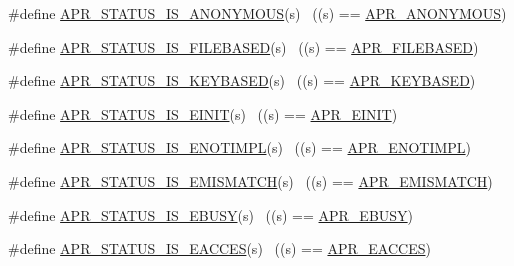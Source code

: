 \begin{DoxyCompactItemize}
\item 
\#define \hyperlink{group___a_p_r___s_t_a_t_u_s___i_s_gaf0184ec185c17a43b2cc47d475f02cbd}{A\+P\+R\+\_\+\+S\+T\+A\+T\+U\+S\+\_\+\+I\+S\+\_\+\+A\+N\+O\+N\+Y\+M\+O\+US}(s)        ~((s) == \hyperlink{group___a_p_r___error_ga738a229b0c27bd96ae0173fecab251b7}{A\+P\+R\+\_\+\+A\+N\+O\+N\+Y\+M\+O\+US})
\item 
\#define \hyperlink{group___a_p_r___s_t_a_t_u_s___i_s_gad8c919d5fa82fcf83bf9e2c911e323f9}{A\+P\+R\+\_\+\+S\+T\+A\+T\+U\+S\+\_\+\+I\+S\+\_\+\+F\+I\+L\+E\+B\+A\+S\+ED}(s)        ~((s) == \hyperlink{group___a_p_r___error_ga28a6d59b62d2698208451a9343399fbb}{A\+P\+R\+\_\+\+F\+I\+L\+E\+B\+A\+S\+ED})
\item 
\#define \hyperlink{group___a_p_r___s_t_a_t_u_s___i_s_ga02052b8fb7367a4c27a88400023941a7}{A\+P\+R\+\_\+\+S\+T\+A\+T\+U\+S\+\_\+\+I\+S\+\_\+\+K\+E\+Y\+B\+A\+S\+ED}(s)          ~((s) == \hyperlink{group___a_p_r___error_gaac52bebace264494fa94cdf0b4344d26}{A\+P\+R\+\_\+\+K\+E\+Y\+B\+A\+S\+ED})
\item 
\#define \hyperlink{group___a_p_r___s_t_a_t_u_s___i_s_ga2941899b37db907199696d523521742e}{A\+P\+R\+\_\+\+S\+T\+A\+T\+U\+S\+\_\+\+I\+S\+\_\+\+E\+I\+N\+IT}(s)                ~((s) == \hyperlink{group___a_p_r___error_gaacd087793c97a3493eafc14075775b82}{A\+P\+R\+\_\+\+E\+I\+N\+IT})
\item 
\#define \hyperlink{group___a_p_r___s_t_a_t_u_s___i_s_gaacb876d49ae81874fc4d48bfa5fea85d}{A\+P\+R\+\_\+\+S\+T\+A\+T\+U\+S\+\_\+\+I\+S\+\_\+\+E\+N\+O\+T\+I\+M\+PL}(s)          ~((s) == \hyperlink{group___a_p_r___error_ga939ddb834a30bc9a5a0a329b13000161}{A\+P\+R\+\_\+\+E\+N\+O\+T\+I\+M\+PL})
\item 
\#define \hyperlink{group___a_p_r___s_t_a_t_u_s___i_s_ga87a446df78fd35f2192e14142f6398c4}{A\+P\+R\+\_\+\+S\+T\+A\+T\+U\+S\+\_\+\+I\+S\+\_\+\+E\+M\+I\+S\+M\+A\+T\+CH}(s)        ~((s) == \hyperlink{group___a_p_r___error_ga31e65a44daba96aa6d943529e94498e7}{A\+P\+R\+\_\+\+E\+M\+I\+S\+M\+A\+T\+CH})
\item 
\#define \hyperlink{group___a_p_r___s_t_a_t_u_s___i_s_gad9da6d9a8f37e1e296b3fc6e67e610e1}{A\+P\+R\+\_\+\+S\+T\+A\+T\+U\+S\+\_\+\+I\+S\+\_\+\+E\+B\+U\+SY}(s)                ~((s) == \hyperlink{group___a_p_r___error_gab6e5bc99dbace4a91d8d0adcbd8fd66b}{A\+P\+R\+\_\+\+E\+B\+U\+SY})
\item 
\#define \hyperlink{group___a_p_r___s_t_a_t_u_s___i_s_gabd43d80532579a4a5763d3c9cb196a06}{A\+P\+R\+\_\+\+S\+T\+A\+T\+U\+S\+\_\+\+I\+S\+\_\+\+E\+A\+C\+C\+ES}(s)              ~((s) == \hyperlink{group___a_p_r___error_ga407fc0ea7ead60f7a97fb9d70061bd41}{A\+P\+R\+\_\+\+E\+A\+C\+C\+ES})

\end{DoxyCompactItemize}

